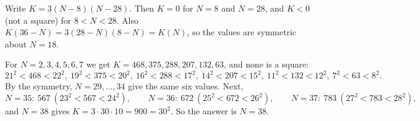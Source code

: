 Write $K=3(N-8)(N-28)$. Then $K=0$ for $N=8$ and $N=28$, and $K<0$ (not a square) for $8<N<28$. Also $K(36-N)=3(28-N)(8-N)=K(N)$, so the values are symmetric about $N=18$.

For $N=2,3,4,5,6,7$ we get $K=468,375,288,207,132,63$, and none is a square:
\[
21^2<468<22^2,\ 19^2<375<20^2,\ 16^2<288<17^2,\ 14^2<207<15^2,\ 11^2<132<12^2,\ 7^2<63<8^2 .
\]
By the symmetry, $N=29,\dots,34$ give the same six values. Next,
\[
N=35:\ 567\ (23^2<567<24^2),\qquad N=36:\ 672\ (25^2<672<26^2),\qquad N=37:\ 783\ (27^2<783<28^2),
\]
and $N=38$ gives $K=3\cdot30\cdot10=900=30^2$. So the answer is $N=\boxed{38}$.
